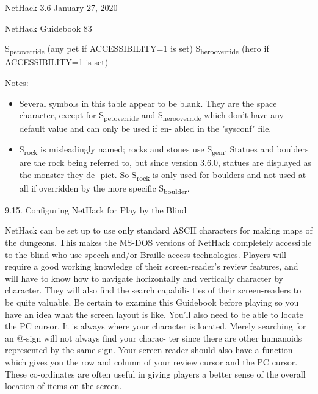 \documentclass[11pt]{article}
\begin{document}
NetHack 3.6                   January 27, 2020





NetHack Guidebook                       83



S\textsubscript{pet}\textsubscript{override}     (any pet if ACCESSIBILITY=1 is set)
S\textsubscript{hero}\textsubscript{override}    (hero if ACCESSIBILITY=1 is set)

Notes:

\begin{itemize}
\item Several symbols in this table appear to be blank. They are the
space character, except for S\textsubscript{pet}\textsubscript{override} and S\textsubscript{hero}\textsubscript{override}
which don't have any default value and can only be used if en-
abled in the "sysconf" file.

\item S\textsubscript{rock} is misleadingly named; rocks and stones use S\textsubscript{gem}.
Statues and boulders are the rock being referred to, but since
version 3.6.0, statues are displayed as the monster they de-
pict.  So S\textsubscript{rock} is only used for boulders and not used at all
if overridden by the more specific S\textsubscript{boulder}.
\end{itemize}

9.15. Configuring NetHack for Play by the Blind

   NetHack can be set up to use only standard ASCII characters
for making maps of the dungeons. This makes the MS-DOS versions
of NetHack completely accessible to the blind who use speech
and/or Braille access technologies. Players will require a good
working knowledge of their screen-reader's review features, and
will have to know how to navigate horizontally and vertically
character by character. They will also find the search capabili-
ties of their screen-readers to be quite valuable. Be certain to
examine this Guidebook before playing so you have an idea what
the screen layout is like. You'll also need to be able to locate
the PC cursor. It is always where your character is located.
Merely searching for an @-sign will not always find your charac-
ter since there are other humanoids represented by the same sign.
Your screen-reader should also have a function which gives you
the row and column of your review cursor and the PC cursor.
These co-ordinates are often useful in giving players a better
sense of the overall location of items on the screen.
\end{document}
